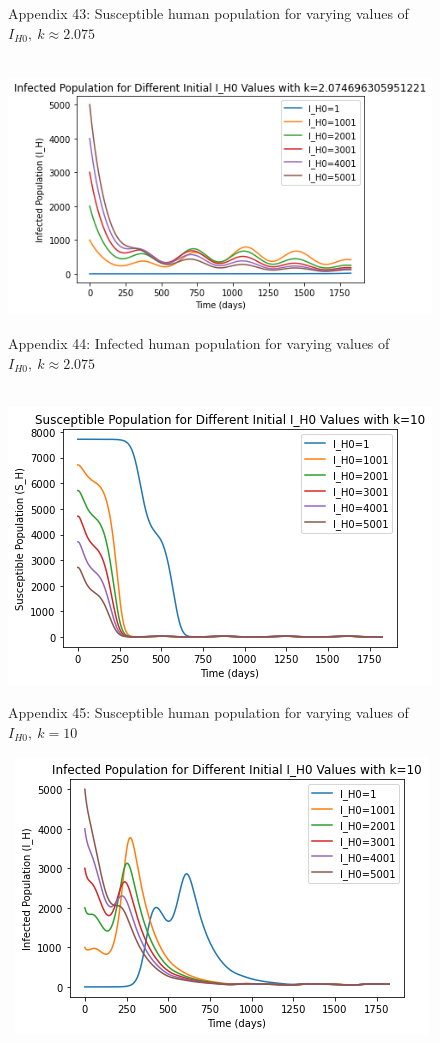 \documentclass[
	12pt,				%
	oneside,			%
	a4paper,			%
	english,			%
	brazil				%
	]{abntex2}
\begin{document}
\begin{apendicesenv}
\begin{figure}[!ht]
	\caption*{Appendix 43: Susceptible human population for varying values of $I_{H0}, \ k \approx 2.075$}
\end{figure}
\begin{figure}[!ht]
	\centering
	\hbox{\hspace{7.0em} \includegraphics[scale=0.65] {THESIS-IH_k=2_075.png}}
	\caption*{Appendix 44: Infected human population for varying values of $I_{H0}, \ k \approx 2.075$}
\end{figure}
\newpage
\begin{figure}[!ht]
	\centering
	\hbox{\hspace{7.0em} \includegraphics[scale=0.65] {THESIS-SH_k=10.png}}
	\caption*{Appendix 45: Susceptible human population for varying values of $I_{H0}, \ k=10$}
\end{figure}
\begin{figure}[!ht]
	\centering
	\hbox{\hspace{7.0em} \includegraphics[scale=0.65] {THESIS-IH_k=10.png}}

\end{figure}
\end{apendicesenv}
\end{document}
